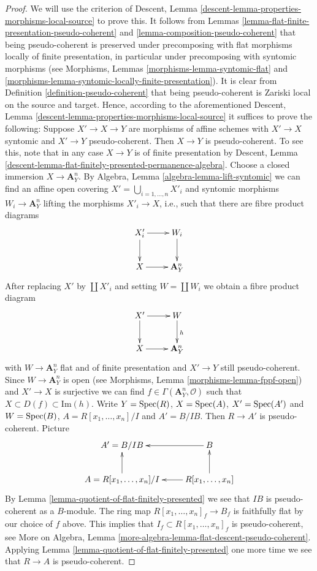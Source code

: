 \begin{proof}
We will use the criterion of
Descent, Lemma \ref{descent-lemma-properties-morphisms-local-source}
to prove this. It follows from
Lemmas \ref{lemma-flat-finite-presentation-pseudo-coherent} and
\ref{lemma-composition-pseudo-coherent}
that being pseudo-coherent is preserved under precomposing with
flat morphisms locally of finite presentation, in particular under
precomposing with syntomic morphisms (see
Morphisms, Lemmas \ref{morphisms-lemma-syntomic-flat} and
\ref{morphisms-lemma-syntomic-locally-finite-presentation}).
It is clear from
Definition \ref{definition-pseudo-coherent}
that being pseudo-coherent is
Zariski local on the source and target.
Hence, according to the aforementioned
Descent, Lemma \ref{descent-lemma-properties-morphisms-local-source}
it suffices to prove the following: Suppose $X' \to X \to Y$ are
morphisms of affine schemes with $X' \to X$ syntomic and $X' \to Y$
pseudo-coherent. Then $X \to Y$ is pseudo-coherent.
To see this, note that in any case $X \to Y$ is of finite presentation by
Descent, Lemma \ref{descent-lemma-flat-finitely-presented-permanence-algebra}.
Choose a closed immersion $X \to \mathbf{A}^n_Y$. By
Algebra, Lemma \ref{algebra-lemma-lift-syntomic}
we can find an affine open covering $X' = \bigcup_{i = 1, \ldots, n} X'_i$
and syntomic morphisms $W_i \to \mathbf{A}^n_Y$ lifting the morphisms
$X'_i \to X$, i.e., such that there are fibre product diagrams
$$
\xymatrix{
X'_i \ar[d] \ar[r] & W_i \ar[d] \\
X \ar[r] & \mathbf{A}^n_Y
}
$$
After replacing $X'$ by $\coprod X'_i$ and setting $W = \coprod W_i$
we obtain a fibre product diagram
$$
\xymatrix{
X' \ar[d] \ar[r] & W \ar[d]^h \\
X \ar[r] & \mathbf{A}^n_Y
}
$$
with $W \to \mathbf{A}^n_Y$ flat and of finite presentation and
$X' \to Y$ still pseudo-coherent. Since
$W \to \mathbf{A}^n_Y$ is open (see
Morphisms, Lemma \ref{morphisms-lemma-fppf-open})
and $X' \to X$ is surjective we can find
$f \in \Gamma(\mathbf{A}^n_Y, \mathcal{O})$ such that
$X \subset D(f) \subset \text{Im}(h)$. Write
$Y = \mathop{\rm Spec}(R)$, $X = \mathop{\rm Spec}(A)$, $X' = \mathop{\rm Spec}(A')$
and $W = \mathop{\rm Spec}(B)$, $A = R[x_1, \ldots, x_n]/I$ and
$A' = B/IB$. Then $R \to A'$ is pseudo-coherent. Picture
$$
\xymatrix{
A' = B/IB & B \ar[l] \\
A = R[x_1, \ldots, x_n]/I \ar[u] & R[x_1, \ldots, x_n] \ar[l] \ar[u]
}
$$
By
Lemma \ref{lemma-quotient-of-flat-finitely-presented}
we see that $IB$ is pseudo-coherent as a $B$-module.
The ring map $R[x_1, \ldots, x_n]_f \to B_f$ is faithfully flat by
our choice of $f$ above. This implies that
$I_f \subset R[x_1, \ldots, x_n]_f$
is pseudo-coherent, see
More on Algebra, Lemma \ref{more-algebra-lemma-flat-descent-pseudo-coherent}.
Applying
Lemma \ref{lemma-quotient-of-flat-finitely-presented}
one more time we see that $R \to A$ is pseudo-coherent.
\end{proof}

